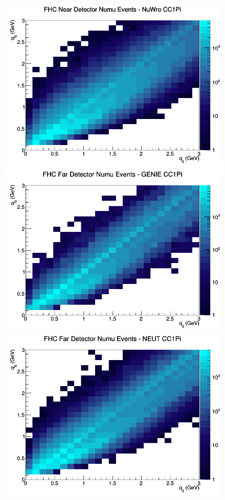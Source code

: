 \begin{figure}[h]
\includegraphics[width=\linewidth]{eff_q0_q3/GAr/CC1Pi_FHC_ND_numu_q3_q0_NuWro.png}
\endminipage
\newline
{}
\includegraphics[width=\linewidth]{eff_q0_q3/GAr/CC1Pi_FHC_FD_numu_q3_q0_GENIE.png}
\endminipage
{}
\includegraphics[width=\linewidth]{eff_q0_q3/GAr/CC1Pi_FHC_FD_numu_q3_q0_NEUT.png}

\end{figure}
